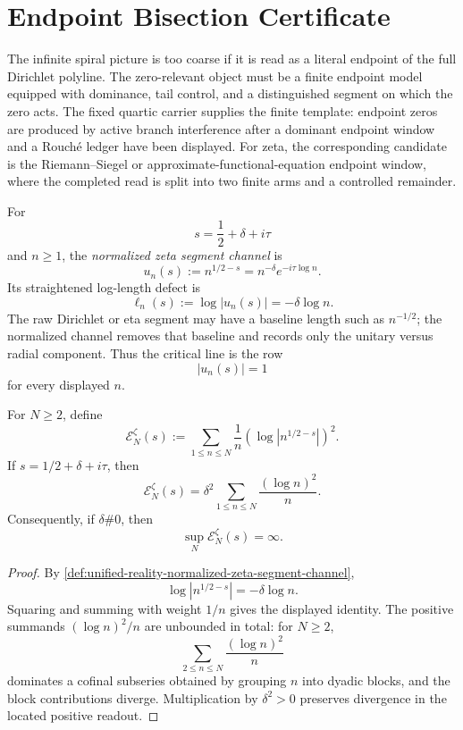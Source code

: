 \section{Endpoint Bisection Certificate}
\label{sec:unified-reality-endpoint-bisection-certificate}

The infinite spiral picture is too coarse if it is read as a literal
endpoint of the full Dirichlet polyline.  The zero-relevant object must
be a finite endpoint model equipped with dominance, tail control, and a
distinguished segment on which the zero acts.  The fixed quartic carrier
supplies the finite template: endpoint zeros are produced by active
branch interference after a dominant endpoint window and a Rouch\'e
ledger have been displayed.  For zeta, the corresponding candidate is
the Riemann--Siegel or approximate-functional-equation endpoint window,
where the completed read is split into two finite arms and a controlled
remainder.

\begin{definition}
\label{def:unified-reality-normalized-zeta-segment-channel}
For
$$
s=\frac12+\delta+i\tau
$$
and $n\ge1$, the \emph{normalized zeta segment channel} is
$$
u_n(s):=n^{1/2-s}=n^{-\delta}e^{-i\tau\log n}.
$$
Its straightened log-length defect is
$$
\ell_n(s):=\log|u_n(s)|=-\delta\log n.
$$
The raw Dirichlet or eta segment may have a baseline length such as
$n^{-1/2}$; the normalized channel removes that baseline and records
only the unitary versus radial component.  Thus the critical line is the
row
$$
|u_n(s)|=1
$$
for every displayed $n$.
\end{definition}

\begin{theorem}
\label{thm:unified-reality-weighted-endpoint-energy-reads-normal-displacement}
For $N\ge2$, define
$$
\mathcal E_N^{\zeta}(s)
:=
\sum_{1\le n\le N}
\frac1n
\left(\log|n^{1/2-s}|\right)^2.
$$
If $s=1/2+\delta+i\tau$, then
$$
\mathcal E_N^{\zeta}(s)
=
\delta^2
\sum_{1\le n\le N}\frac{(\log n)^2}{n}.
$$
Consequently, if $\delta\#0$, then
$$
\sup_N\mathcal E_N^{\zeta}(s)=\infty.
$$
\end{theorem}

\begin{proof}
By
\autoref{def:unified-reality-normalized-zeta-segment-channel},
$$
\log|n^{1/2-s}|=-\delta\log n.
$$
Squaring and summing with weight $1/n$ gives the displayed identity.
The positive summands $(\log n)^2/n$ are unbounded in total: for
$N\ge2$,
$$
\sum_{2\le n\le N}\frac{(\log n)^2}{n}
$$
dominates a cofinal subseries obtained by grouping $n$ into dyadic
blocks, and the block contributions diverge.  Multiplication by
$\delta^2>0$ preserves divergence in the located positive readout.
\end{proof}


